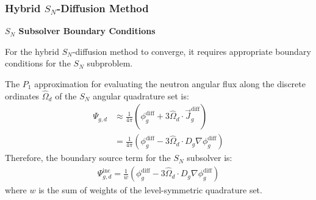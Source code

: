 \begin{frame}
  \frametitle{Hybrid $S_N$-Diffusion Method}
  \textbf{$S_N$ Subsolver Boundary Conditions}
  \vspace{.2cm}

  For the hybrid $S_N$-diffusion method to converge, it requires appropriate boundary conditions for
  the $S_N$ subproblem.

  The $P_1$ approximation for evaluating the neutron angular flux along
  the discrete ordinates $\hat{\Omega}_d$ of the $S_N$ angular quadrature set is:
  \begin{align}
    \Psi_{g,d} &\approx \frac{1}{4\pi}\left(\phi^\text{diff}_g+3\hat{\Omega}_d\cdot
    \vec{J}^\text{diff}_g\right) \nonumber \\
    &=\frac{1}{4\pi}\left(\phi^\text{diff}_g-3\hat{\Omega}_d\cdot D_g\nabla\phi^\text{diff}_g\right)
  \end{align}
  Therefore, the boundary source term for the $S_N$ subsolver is:
  \begin{gather}
    \Psi^\text{inc}_{g,d} = \frac{1}{w}
    \left(\phi^\text{diff}_g-3\hat{\Omega}_d\cdot D_g\nabla\phi^\text{diff}_g\right)
  \end{gather}
  where $w$ is the sum of weights of the level-symmetric quadrature set.
\end{frame}

